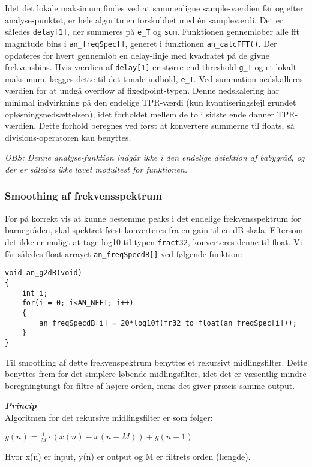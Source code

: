Idet det lokale maksimum findes ved at sammenligne sample-værdien før og efter analyse-punktet, er hele algoritmen forskubbet med én sampleværdi. Det er således \verb+delay[1]+, der summeres på \verb+e_T+ og \verb+sum+. Funktionen gennemløber alle fft magnitude bins i \verb+an_freqSpec[]+, generet i funktionen \verb+an_calcFFT()+. Der opdateres for hvert gennemløb en delay-linje med kvadratet på de givne frekvensbins. Hvis værdien af \verb+delay[1]+ er større end threshold \verb+g_T+ og et lokalt maksimum, lægges dette til det tonale indhold, \verb+e_T+. Ved summation nedskalleres værdien for at undgå overflow af fixedpoint-typen. Denne nedskalering har minimal indvirkning på den endelige TPR-værdi (kun kvantiseringsfejl grundet opløsningsnedsættelsen), idet forholdet mellem de to i sidste ende danner TPR-værdien. Dette forhold beregnes ved først at konvertere summerne til floats, så divisions-operatoren kan benyttes.

\textit{OBS: Denne analyse-funktion indgår ikke i den endelige detektion af babygråd, og der er således ikke lavet modultest for funktionen.}

\subsubsection{Smoothing af frekvensspektrum}
For på korrekt vis at kunne bestemme peaks i det endelige frekvensspektrum for barnegråden, skal spektret først konverteres fra en gain til en dB-skala. Eftersom det ikke er muligt at tage log10 til typen \verb+fract32+, konverteres denne til float. Vi får således float arrayet \verb+an_freqSpecdB[]+ ved følgende funktion:
\begin{verbatim}void an_g2dB(void)
{
    int i;
    for(i = 0; i<AN_NFFT; i++)
    {
        an_freqSpecdB[i] = 20*log10f(fr32_to_float(an_freqSpec[i]));
    }
}\end{verbatim}

Til smoothing af dette frekvenspektrum benyttes et rekursivt midlingsfilter. Dette benyttes frem for det simplere løbende midlingsfilter, idet det er væsentlig mindre beregningtungt for filtre af højere orden, mens det giver præcis samme output.

\textbf{\textit{Princip}} \\
Algoritmen for det rekursive midlingsfilter er som følger:
\begin{center}
$y\left( n \right) =\frac { 1 }{ M } \cdot \left( x\left( n \right) -x\left( n-M \right)  \right) +y\left( n-1 \right) $
\end{center}
Hvor x(n) er input, y(n) er output og M er filtrets orden (længde).


